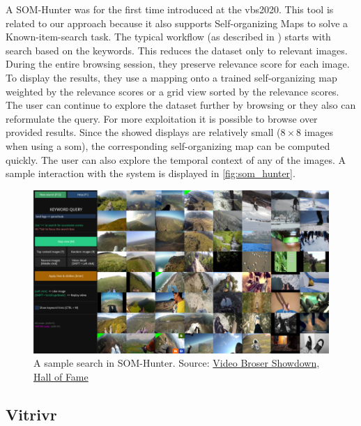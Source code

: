 A SOM-Hunter was for the first time introduced at the \acrshort{vbs}2020. This tool is related to our approach because it also supports Self-organizing Maps to solve a Known-item-search task. The typical workflow (as described in \cite{kratochvil2020som}) starts with search based on the keywords. This reduces the dataset only to relevant images. During the entire browsing session, they preserve relevance score for each image. To display the results, they use a mapping onto a trained self-organizing map weighted by the relevance scores or a grid view sorted by the relevance scores. The user can continue to explore the dataset further by browsing or they also can reformulate the query. For more exploitation it is possible to browse over provided results. Since the showed displays are relatively small ($8\times8$ images when using a \acrshort{som}), the corresponding self-organizing map can be computed quickly. The user can also explore the temporal context of any of the images. A sample interaction with the system is displayed in \autoref{fig:som_hunter}.


\begin{figure}
    \centering
    \includegraphics[width=0.99\linewidth]{img/som_hunter_small.png}
    \caption[A sample search in SOM-Hunter]{A sample search in SOM-Hunter. Source: \href{https://videobrowsershowdown.org/hall-of-fame/}{Video Broser Showdown, Hall of Fame}}
    \label{fig:som_hunter}
\end{figure}

\subsection{Vitrivr}

